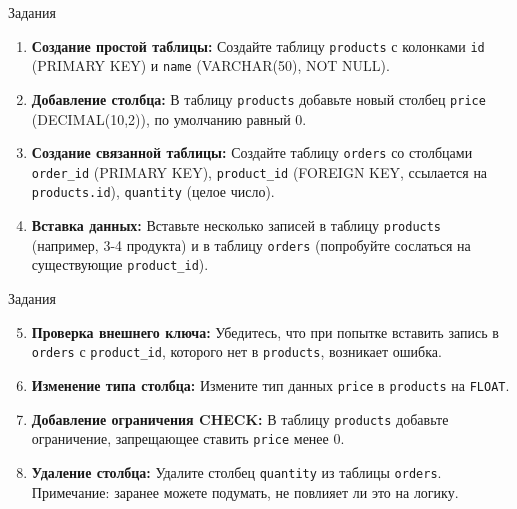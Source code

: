 \documentclass{beamer}
\begin{document}
\begin{frame}{Задания}
	\begin{enumerate}
		\item \textbf{Создание простой таблицы:}
		      Создайте таблицу \texttt{products} с колонками \texttt{id} (PRIMARY KEY) и \texttt{name} (VARCHAR(50), NOT NULL).

		\item \textbf{Добавление столбца:}
		      В таблицу \texttt{products} добавьте новый столбец \texttt{price} (DECIMAL(10,2)), по умолчанию равный 0.

		\item \textbf{Создание связанной таблицы:}
		      Создайте таблицу \texttt{orders} со столбцами \texttt{order\_id} (PRIMARY KEY), \texttt{product\_id} (FOREIGN KEY, ссылается на \texttt{products.id}), \texttt{quantity} (целое число).

		\item \textbf{Вставка данных:}
		      Вставьте несколько записей в таблицу \texttt{products} (например, 3-4 продукта) и в таблицу \texttt{orders} (попробуйте сослаться на существующие \texttt{product\_id}).

	\end{enumerate}
\end{frame}

\begin{frame}{Задания}
	\begin{enumerate}
		\setcounter{enumi}{4}
		\item \textbf{Проверка внешнего ключа:}
		      Убедитесь, что при попытке вставить запись в \texttt{orders} с \texttt{product\_id}, которого нет в \texttt{products}, возникает ошибка.

		\item \textbf{Изменение типа столбца:}
		      Измените тип данных \texttt{price} в \texttt{products} на \texttt{FLOAT}.


		\item \textbf{Добавление ограничения CHECK:}
		      В таблицу \texttt{products} добавьте ограничение, запрещающее ставить \texttt{price} менее 0.

		\item \textbf{Удаление столбца:}
		      Удалите столбец \texttt{quantity} из таблицы \texttt{orders}. Примечание: заранее можете подумать, не повлияет ли это на логику.
	\end{enumerate}
\end{frame}
\end{document}
